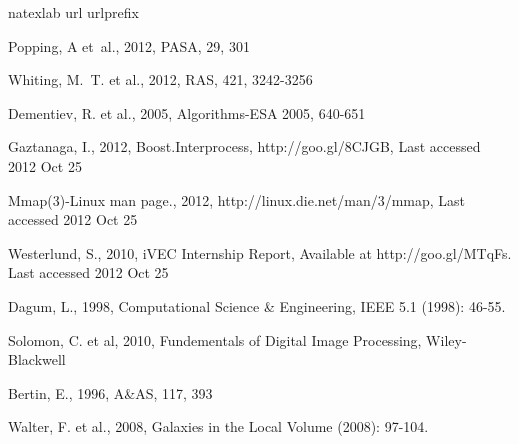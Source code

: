 \documentclass[11pt, twoside]{article}
\begin{document}
\begin{thebibliography}{}
\expandafter\ifx\csname natexlab\endcsname\relax\def\natexlab#1{#1}\fi
\expandafter\ifx\csname url\endcsname\relax
  \def\url#1{\texttt{#1}}\fi
\expandafter\ifx\csname urlprefix\endcsname\relax\def\urlprefix{URL }\fi
\providecommand{\eprint}[2][]{\url{#2}}

Popping, A et~al., 2012, PASA, 29, 301

Whiting, M.~T. et al., 2012, RAS, 421, 3242-3256

Dementiev, R. et al., 2005, Algorithms-ESA 2005, 640-651

Gaztanaga, I., 2012, {Boost.Interprocess}, http://goo.gl/8CJGB, Last accessed 2012 Oct 25

Mmap(3)-Linux man page., 2012, http://linux.die.net/man/3/mmap, Last accessed 2012 Oct 25

Westerlund, S., 2010, iVEC Internship Report, Available at http://goo.gl/MTqFs. Last accessed 2012 Oct 25


Dagum, L., 1998, {Computational Science \& Engineering}, IEEE 5.1 (1998): 46-55.

Solomon, C. et al, 2010, Fundementals of Digital Image Processing, Wiley-Blackwell


Bertin, E., 1996, A\&AS, 117, 393

Walter, F. et al., 2008, Galaxies in the Local Volume (2008): 97-104.

\end{thebibliography}
\end{document}
